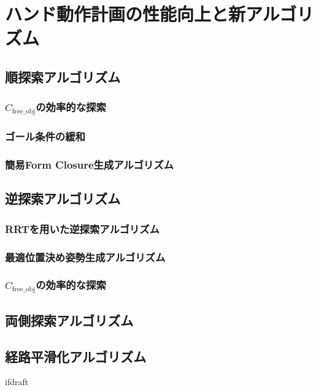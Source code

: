 \documentclass[a4paper,twoside,12pt,papersize, dvipdfmx]{iirthesis}
\begin{document}
    \newcommand{\figref}[1]{\figurename\ref{#1}}
    \newcommand{\tabref}[1]{\tablename\ref{#1}}
    \renewcommand{\eqref}[1]{式~(\ref{#1})}
    \newcommand{\chapref}[1]{\ref{#1}章}
    \newcommand{\secref}[1]{\ref{#1}節}
    \newcommand{\ssecref}[1]{\ref{#1}項}
    \newcommand{\appref}[1]{付録\ref{#1}}
\fi


\chapter{ハンド動作計画の性能向上と新アルゴリズム}\label{chap::planner}
\minitoc

\section{順探索アルゴリズム}
\subsection{$C_{\mathrm{free\_obj}}$の効率的な探索}
\subsection{ゴール条件の緩和}
\subsection{簡易Form Closure生成アルゴリズム}


\section{逆探索アルゴリズム}
\subsection{RRTを用いた逆探索アルゴリズム}
\subsection{最適位置決め姿勢生成アルゴリズム}
\subsection{$C_{\mathrm{free\_obj}}$の効率的な探索}


\section{両側探索アルゴリズム}


\section{経路平滑化アルゴリズム}



\expandafter\ifx\csname ifdraft\endcsname\relax
    
\end{document}
